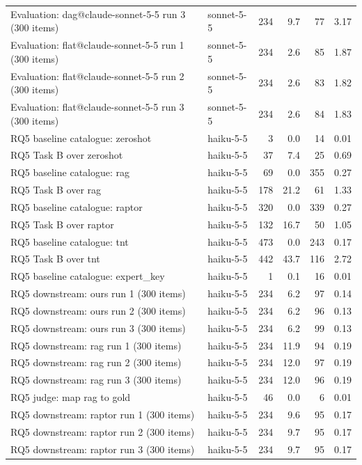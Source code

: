 \begin{tabular}{llrrrr}
Evaluation: dag@claude-sonnet-5-5 run 3 (300 items) & sonnet-5-5 & 234 & 9.7 & 77 & 3.17 \\
Evaluation: flat@claude-sonnet-5-5 run 1 (300 items) & sonnet-5-5 & 234 & 2.6 & 85 & 1.87 \\
Evaluation: flat@claude-sonnet-5-5 run 2 (300 items) & sonnet-5-5 & 234 & 2.6 & 83 & 1.82 \\
Evaluation: flat@claude-sonnet-5-5 run 3 (300 items) & sonnet-5-5 & 234 & 2.6 & 84 & 1.83 \\
RQ5 baseline catalogue: zeroshot & haiku-5-5 & 3 & 0.0 & 14 & 0.01 \\
RQ5 Task B over zeroshot & haiku-5-5 & 37 & 7.4 & 25 & 0.69 \\
RQ5 baseline catalogue: rag & haiku-5-5 & 69 & 0.0 & 355 & 0.27 \\
RQ5 Task B over rag & haiku-5-5 & 178 & 21.2 & 61 & 1.33 \\
RQ5 baseline catalogue: raptor & haiku-5-5 & 320 & 0.0 & 339 & 0.27 \\
RQ5 Task B over raptor & haiku-5-5 & 132 & 16.7 & 50 & 1.05 \\
RQ5 baseline catalogue: tnt & haiku-5-5 & 473 & 0.0 & 243 & 0.17 \\
RQ5 Task B over tnt & haiku-5-5 & 442 & 43.7 & 116 & 2.72 \\
RQ5 baseline catalogue: expert_key & haiku-5-5 & 1 & 0.1 & 16 & 0.01 \\
RQ5 downstream: ours run 1 (300 items) & haiku-5-5 & 234 & 6.2 & 97 & 0.14 \\
RQ5 downstream: ours run 2 (300 items) & haiku-5-5 & 234 & 6.2 & 96 & 0.13 \\
RQ5 downstream: ours run 3 (300 items) & haiku-5-5 & 234 & 6.2 & 99 & 0.13 \\
RQ5 downstream: rag run 1 (300 items) & haiku-5-5 & 234 & 11.9 & 94 & 0.19 \\
RQ5 downstream: rag run 2 (300 items) & haiku-5-5 & 234 & 12.0 & 97 & 0.19 \\
RQ5 downstream: rag run 3 (300 items) & haiku-5-5 & 234 & 12.0 & 96 & 0.19 \\
RQ5 judge: map rag to gold & haiku-5-5 & 46 & 0.0 & 6 & 0.01 \\
RQ5 downstream: raptor run 1 (300 items) & haiku-5-5 & 234 & 9.6 & 95 & 0.17 \\
RQ5 downstream: raptor run 2 (300 items) & haiku-5-5 & 234 & 9.7 & 95 & 0.17 \\
RQ5 downstream: raptor run 3 (300 items) & haiku-5-5 & 234 & 9.7 & 95 & 0.17 \\

\end{tabular}
